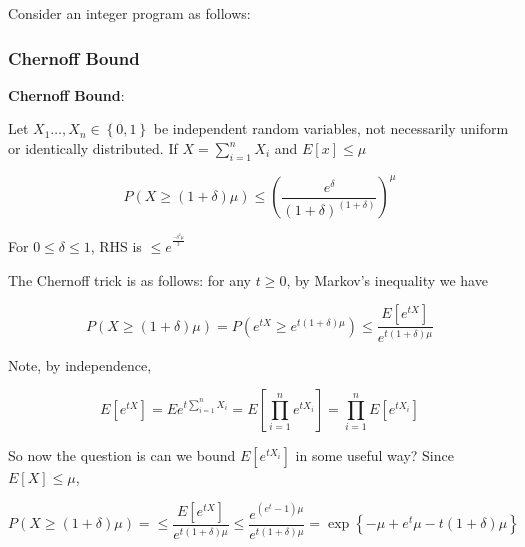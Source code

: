 \documentclass[../notes.tex]{subfiles}
\begin{document}


Consider an integer program as follows:




\subsubsection{Chernoff Bound}


\begin{definition}
    \textbf{Chernoff Bound}: 

Let $ X_1 \ldots,  X_n \in \left\{ 0, 1 \right\}  $ be independent random variables, not necessarily uniform or identically distributed. If $ X = \sum^n_{i=1} X_i $ and $ E[x] \le \mu $

\begin{equation}
    P(X \ge (1+\delta)\mu) \le  (\frac{e^\delta}{(1+\delta)^{(1+\delta)}})^\mu
\end{equation}

For $ 0 \le  \delta \le  1 $, RHS is $ \le e^{^\frac{-\delta^2\mu}{3}} $

\end{definition}


The Chernoff trick is as follows: for any $ t\ge 0 $, by Markov's inequality we have


\begin{equation}
    P(X \ge (1+\delta) \mu) = P(e^{tX} \ge e^{t(1+\delta)\mu}) \le \frac{E[e^{tX}]}{e^{t(1+\delta)\mu}}
\end{equation}


Note, by independence, 

\begin{equation}
    E[e^{tX}] = E e^{t\sum^n_{i=1} X_i}  = E \left[ \prod^n_{i=1} e^{tX_i} \right] = \prod^n_{i=1} E[e^{tX_i}]
\end{equation}


So now the question is can we bound $ E[e^{tX_i}] $ in some useful way?
Since $ E[X] \le  \mu $,

\begin{equation}
    P(X \ge (1+\delta) \mu) = \le \frac{E[e^{tX}]}{e^{t(1+\delta)\mu}} \le  \frac{e^{(e^t - 1)\mu}}{e^{t(1+\delta)\mu}} = \exp \left\{ -\mu + e^t \mu - t(1+\delta) \mu \right\} 
\end{equation}
\end{document}
